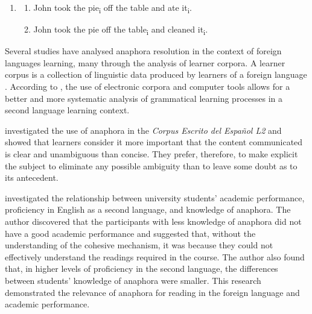 \documentclass{textolivre}
\begin{document}
%
%
\begin{enumerate}[wide,label=(\arabic*),topsep=1ex,partopsep=1ex,noitemsep,leftmargin=0.15cm,resume]
\setlength{\itemindent}{0em}
\item[]{} \addtocounter{enumi}{1} 
\begin{enumerate}[wide,label=(\arabic{enumi}\alph*),topsep=1ex,partopsep=1ex,noitemsep]
\setlength{\itemindent}{0em}
\item \label{itm-6a} John took the pie\textsubscript{i} off the table and ate it\textsubscript{i}.
\item \label{itm-6b} John took the pie off the table\textsubscript{i} and cleaned it\textsubscript{i}.
\end{enumerate}
\end{enumerate}


Several studies have analysed anaphora resolution in the context of
foreign languages learning, many through the analysis of learner
corpora. A learner corpus is a collection of linguistic data
produced by learners of a foreign language \cite[p. 65]{mcenery_corpus_2006}.
According to \textcite[p. 288]{mitchell_second_2013}, the
use of electronic corpora and computer tools allows for a better
and more systematic analysis of grammatical learning processes in a
second language learning context.

\textcite{lozano_2016} investigated the use of anaphora in the \emph{Corpus
Escrito del Español L2} and showed that learners consider it more
important that the content communicated is clear and unambiguous than
concise. They prefer, therefore, to make explicit the subject to
eliminate any possible ambiguity than to leave some doubt as to its
antecedent.

\textcite{pretorius_english_2005} investigated the relationship between university
students' academic performance, proficiency in English as a second
language, and knowledge of anaphora. The author discovered that the
participants with less knowledge of anaphora did not have a good
academic performance and suggested that, without the understanding of
the cohesive mechanism, it was because they could not effectively
understand the readings required in the course. The author also found
that, in higher levels of proficiency in the second language, the
differences between students' knowledge of anaphora were smaller. This
research demonstrated the relevance of anaphora for reading in the
foreign language and academic performance.
\end{document}

